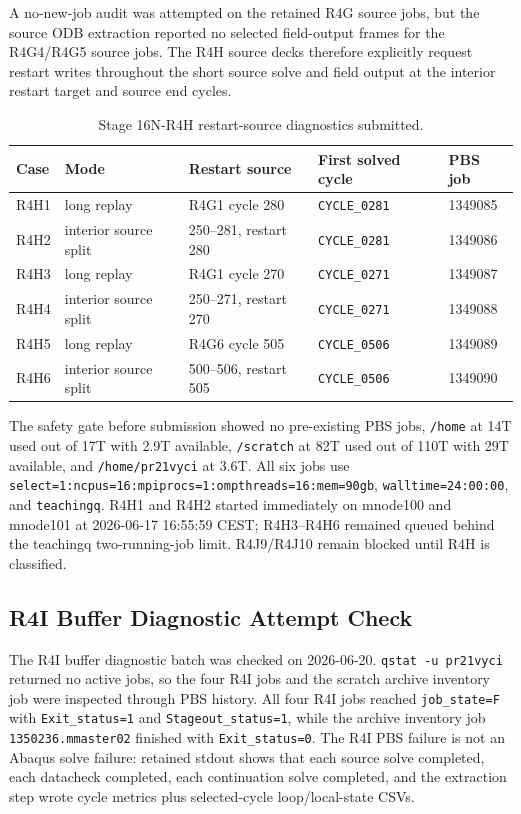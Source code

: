 \documentclass[11pt,a4paper]{article}
\newcommand{\code}[1]{\texttt{#1}}
\begin{document}
A no-new-job audit was attempted on the retained R4G source jobs, but the source ODB extraction reported no selected field-output frames for the R4G4/R4G5 source jobs. The R4H source decks therefore explicitly request restart writes throughout the short source solve and field output at the interior restart target and source end cycles.

\begin{table}[H]
\centering
\caption{Stage 16N-R4H restart-source diagnostics submitted.}
\begin{tabular}{lllll}
\toprule
Case & Mode & Restart source & First solved cycle & PBS job \\
\midrule
R4H1 & long replay & R4G1 cycle 280 & \code{CYCLE\_0281} & 1349085 \\
R4H2 & interior source split & 250--281, restart 280 & \code{CYCLE\_0281} & 1349086 \\
R4H3 & long replay & R4G1 cycle 270 & \code{CYCLE\_0271} & 1349087 \\
R4H4 & interior source split & 250--271, restart 270 & \code{CYCLE\_0271} & 1349088 \\
R4H5 & long replay & R4G6 cycle 505 & \code{CYCLE\_0506} & 1349089 \\
R4H6 & interior source split & 500--506, restart 505 & \code{CYCLE\_0506} & 1349090 \\
\bottomrule
\end{tabular}
\end{table}

The safety gate before submission showed no pre-existing PBS jobs, \code{/home} at 14T used out of 17T with 2.9T available, \code{/scratch} at 82T used out of 110T with 29T available, and \code{/home/pr21vyci} at 3.6T. All six jobs use \code{select=1:ncpus=16:mpiprocs=1:ompthreads=16:mem=90gb}, \code{walltime=24:00:00}, and \code{teachingq}. R4H1 and R4H2 started immediately on mnode100 and mnode101 at 2026-06-17 16:55:59 CEST; R4H3--R4H6 remained queued behind the teachingq two-running-job limit. R4J9/R4J10 remain blocked until R4H is classified.

\subsection{R4I Buffer Diagnostic Attempt Check}

The R4I buffer diagnostic batch was checked on 2026-06-20. \code{qstat -u pr21vyci} returned no active jobs, so the four R4I jobs and the scratch archive inventory job were inspected through PBS history. All four R4I jobs reached \code{job\_state=F} with \code{Exit\_status=1} and \code{Stageout\_status=1}, while the archive inventory job \code{1350236.mmaster02} finished with \code{Exit\_status=0}. The R4I PBS failure is not an Abaqus solve failure: retained stdout shows that each source solve completed, each datacheck completed, each continuation solve completed, and the extraction step wrote cycle metrics plus selected-cycle loop/local-state CSVs.
\end{document}

